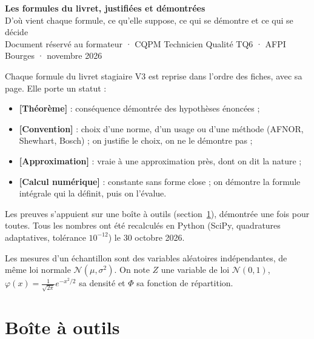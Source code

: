 \documentclass[11pt,a4paper]{article}
\theoremstyle{tq}
\theoremstyle{remark}
\newcommand{\thm}{\textcolor{vertTQ}{\textbf{[Théorème]}}}
\newcommand{\conv}{\textcolor{orangeTQ}{\textbf{[Convention]}}}
\newcommand{\appr}{\textcolor{uimmred}{\textbf{[Approximation]}}}
\newcommand{\num}{\textcolor{uimmblue}{\textbf{[Calcul numérique]}}}
\newcommand{\N}{\mathcal{N}}
\begin{document}
\begin{tcolorbox}[colback=uimmblue,colframe=uimmblue,coltext=white,arc=2pt]
{\LARGE\bfseries Les formules du livret, justifiées et démontrées}\\[3pt]
{\large D'où vient chaque formule, ce qu'elle suppose, ce qui se démontre et ce qui se décide}\\[3pt]
{\small Document réservé au formateur · CQPM Technicien Qualité TQ6 · AFPI Bourges · novembre 2026}
\end{tcolorbox}

\begin{cle}
Chaque formule du livret stagiaire V3 est reprise dans l'ordre des fiches, avec sa page. Elle porte un statut :
\begin{itemize}[nosep,leftmargin=1.2em]
\item \thm{} : conséquence démontrée des hypothèses énoncées ;
\item \conv{} : choix d'une norme, d'un usage ou d'une méthode (AFNOR, Shewhart, Bosch) ; on justifie le choix, on ne le démontre pas ;
\item \appr{} : vraie à une approximation près, dont on dit la nature ;
\item \num{} : constante sans forme close ; on démontre la formule intégrale qui la définit, puis on l'évalue.
\end{itemize}
Les preuves s'appuient sur une boîte à outils (section~\ref{sec:outils}), démontrée une fois pour toutes. Tous les nombres ont été recalculés en Python (SciPy, quadratures adaptatives, tolérance $10^{-12}$) le 30 octobre 2026.
\end{cle}

\begin{classe}
Les mesures d'un échantillon sont des variables aléatoires indépendantes, de même loi normale $\N(\mu,\sigma^2)$. On note $Z$ une variable de loi $\N(0,1)$, $\varphi(x)=\frac{1}{\sqrt{2\pi}}e^{-x^2/2}$ sa densité et $\Phi$ sa fonction de répartition.
\end{classe}

\tableofcontents

\section{Boîte à outils}\label{sec:outils}
\end{document}
